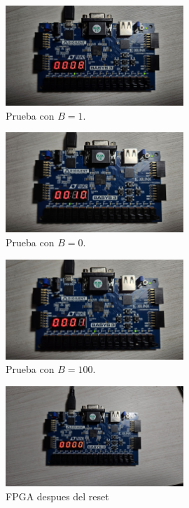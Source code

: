 \begin{figure}[H]
    \centering
    \includegraphics[width=0.6\textwidth]{img/fpga5.png}
    \caption{Prueba con $B=1$.}
    \label{fig:fpga5}
\end{figure}

\begin{figure}[H]
    \centering
    \includegraphics[width=0.6\textwidth]{img/fpga6.png}
    \caption{Prueba con $B=0$.}
    \label{fig:fpga6}
\end{figure}

\begin{figure}[H]
    \centering
    \includegraphics[width=0.6\textwidth]{img/fpga7.png}
    \caption{Prueba con $B=100$.}
    \label{fig:fpga7}
\end{figure}

\begin{figure}[H]
    \centering
    \includegraphics[width=0.6\textwidth]{img/fpga8.png}
    \caption{FPGA despues del reset}
    \label{fig:fpga8}
\end{figure}
